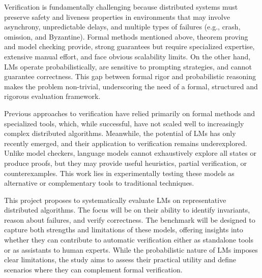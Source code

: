Verification is fundamentally challenging because distributed systems must preserve safety and liveness properties \cite{alpern1985safety} in environments that may involve asynchrony, unpredictable delays, and multiple types of failures (e.g., crash, omission, and Byzantine). Formal methods mentioned above, theorem proving and model checking provide, strong guarantees but require specialized expertise, extensive manual effort, and face obvious scalability limits\cite{nawaz2019survey}. On the other hand, LMs operate probabilistically, are sensitive to prompting strategies, and cannot guarantee correctness. This gap between formal rigor and probabilistic reasoning makes the problem non-trivial, underscoring the need of a formal, structured and rigorous evaluation framework.

Previous approaches to verification have relied primarily on formal methods and specialized tools, which, while successful\cite{lamport1998paxos}, have not scaled well to increasingly complex distributed algorithms\cite{clarke1999modelchecking}. Meanwhile, the potential of LMs has only recently emerged, and their application to verification remains underexplored. Unlike model checkers, language models cannot exhaustively explore all states or produce proofs, but they may provide useful heuristics, partial verification, or counterexamples. This work lies in experimentally testing these models as alternative or complementary tools to traditional techniques.

This project proposes to systematically evaluate LMs on representative distributed algorithms\cite{bracha, flp}. The focus will be on their ability to identify invariants, reason about failures, and verify correctness. The benchmark will be designed to capture both strengths and limitations of these models, offering insights into whether they can contribute to automatic verification either as standalone tools or as assistants to human experts. While the probabilistic nature of LMs imposes clear limitations, the study aims to assess their practical utility and define scenarios where they can complement formal verification.


